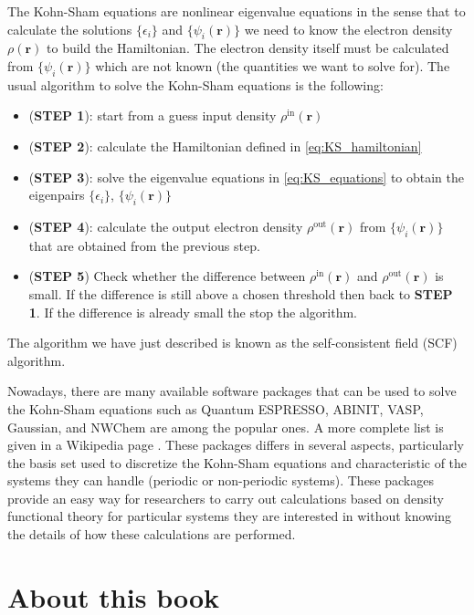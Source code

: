 The Kohn-Sham equations are nonlinear eigenvalue equations in the sense that to calculate the
solutions $\{\epsilon_{i}\}$ and $\{\psi_{i}(\mathbf{r})\}$ we need to know
the electron density $\rho(\mathbf{r})$ to build the Hamiltonian. The electron density
itself must be calculated from $\{\psi_{i}(\mathbf{r})\}$ which are not known (the quantities
we want to solve for). The usual algorithm to solve the Kohn-Sham equations is the following:
\begin{itemize}
\item (\textbf{STEP 1}): start from a guess input density $\rho^{\mathrm{in}}(\mathbf{r})$
\item (\textbf{STEP 2}): calculate the Hamiltonian defined in \eqref{eq:KS_hamiltonian}
\item (\textbf{STEP 3}): solve the eigenvalue equations in \eqref{eq:KS_equations} to obtain the eigenpairs
  $\{\epsilon_{i}\}$, $\{\psi_{i}(\mathbf{r})\}$
\item (\textbf{STEP 4}): calculate the output electron density $\rho^{\mathrm{out}}(\mathbf{r})$
  from $\{\psi_{i}(\mathbf{r})\}$
  that are obtained from the previous step.
\item (\textbf{STEP 5}) Check whether the difference between $\rho^{\mathrm{in}}(\mathbf{r})$
  and $\rho^{\mathrm{out}}(\mathbf{r})$ is small.
  If the difference is still above a chosen threshold then back to \textbf{STEP 1}.
  If the difference is already small the stop the algorithm.
\end{itemize}
The algorithm we have just described is known as the self-consistent field (SCF) algorithm.

Nowadays, there are many available software packages that can be used to solve the Kohn-Sham
equations such as Quantum ESPRESSO, ABINIT, VASP, Gaussian, and NWChem are among the
popular ones. A more complete list is given in a Wikipedia page \cite{wiki-dft-softwares}.
These packages differs in several aspects, particularly the basis set used to discretize
the Kohn-Sham equations and characteristic of the systems they can handle (periodic or non-periodic
systems). These packages provide an easy way for researchers to carry out calculations based
on density functional theory for particular systems they are interested in without knowing the
details of how these calculations are performed.

\section{About this book}

